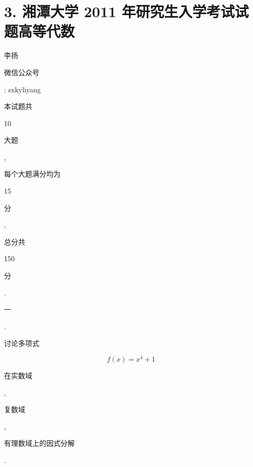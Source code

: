 \documentclass[10pt]{article}
\begin{document}
\section{3. 湘潭大学 2011 年研究生入学考试试题高等代数}
\begin{CJK}{UTF8}{mj}李扬\end{CJK}

\begin{CJK}{UTF8}{mj}微信公众号\end{CJK}: sxkyliyang

\begin{CJK}{UTF8}{mj}本试题共\end{CJK} 10 \begin{CJK}{UTF8}{mj}大题\end{CJK}, \begin{CJK}{UTF8}{mj}每个大题满分均为\end{CJK} 15 \begin{CJK}{UTF8}{mj}分\end{CJK}, \begin{CJK}{UTF8}{mj}总分共\end{CJK} 150 \begin{CJK}{UTF8}{mj}分\end{CJK}.

\begin{CJK}{UTF8}{mj}一\end{CJK}. \begin{CJK}{UTF8}{mj}讨论多项式\end{CJK}
$$
f(x)=x^{4}+1
$$
\begin{CJK}{UTF8}{mj}在实数域\end{CJK}, \begin{CJK}{UTF8}{mj}复数域\end{CJK}, \begin{CJK}{UTF8}{mj}有理数域上的因式分解\end{CJK}.
\end{document}

